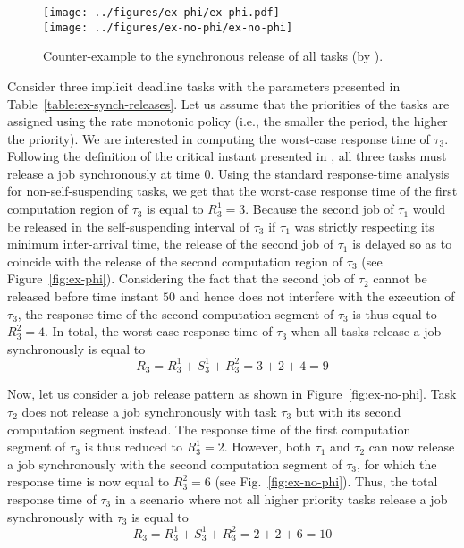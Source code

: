 \ifpaper
\begin{figure}[t]
  \centering
\captionsetup[subfigure]{width=\columnwidth}
  \texttt{[image: ../figures/ex-phi/ex-phi.pdf]} \\
  \texttt{[image: ../figures/ex-no-phi/ex-no-phi]}
  \caption{Counter-example to the synchronous release of all tasks (by \cite{LR:rtas10}).}
  \label{fig:ex-synch-releases}
\end{figure}
\fi

Consider three implicit deadline tasks with the parameters presented in Table~\ref{table:ex-synch-releases}. Let us assume that the priorities of the tasks are assigned using the rate monotonic policy (i.e., the smaller the period, the higher the priority). We are interested in computing the worst-case response time of $\tau_3$. Following the definition of the critical instant presented in \cite{LR:rtas10}, all three tasks must release a job synchronously at time $0$. Using the standard response-time analysis for non-self-suspending tasks, we get that the worst-case response time of the first computation region of $\tau_3$ is equal to $R_3^1 = 3$. Because the second job of $\tau_1$ would be released in the self-suspending interval of $\tau_3$ if $\tau_1$ was strictly respecting its minimum inter-arrival time, the release of the second job of $\tau_1$ is delayed so as to coincide with the release of the second computation region of $\tau_3$ (see Figure~\ref{fig:ex-phi}). Considering the fact that the second job of $\tau_2$ cannot be released before time instant $50$ and hence does not interfere with the execution of $\tau_3$, the response time of the second computation segment of $\tau_3$ is thus equal to $R_3^2=4$. In total, the worst-case response time of $\tau_3$ when all tasks release a job synchronously is equal to 
$$R_3 = R_3^1 + S_3^1 + R_3^2 = 3 + 2 +4 = 9$$

Now, let us consider a job release pattern as shown in Figure~\ref{fig:ex-no-phi}. Task $\tau_2$ does not release a job synchronously with task $\tau_3$ but with its second computation segment instead. The response time of the first computation segment of $\tau_3$ is thus reduced to $R_3^1=2$. However, both $\tau_1$ and $\tau_2$ can now release a job synchronously with the second computation segment of $\tau_3$, for which the response time is now equal to $R_3^2=6$ (see Fig.~\ref{fig:ex-no-phi}). Thus, the total response time of $\tau_3$ in a scenario where not all higher priority tasks release a job synchronously with $\tau_3$ is equal to 
$$R_3 = R_3^1 + S_3^1 + R_3^2 = 2+2+6 = 10$$

